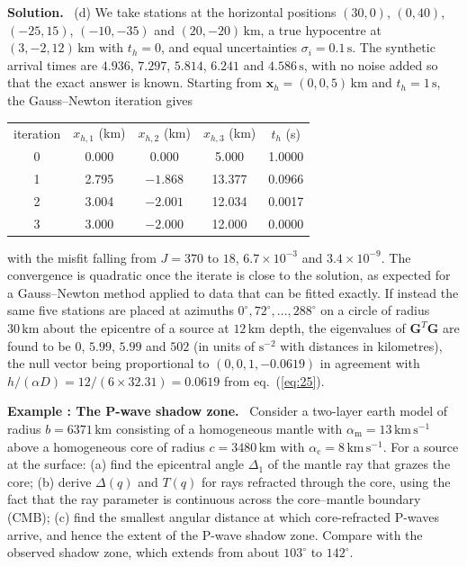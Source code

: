 \documentclass[a4paper,12pt]{paper}
\newcounter{example}
\renewenvironment{example}[1]{%
  \refstepcounter{example}%
  \begin{mdframed}[linewidth=1pt,innertopmargin=6pt,innerbottommargin=6pt]%
  \noindent\textbf{Example \theexample: #1.}\ }{%
  \end{mdframed}}
\newenvironment{solution}{\par\noindent\textbf{Solution.}\ }{\par\medskip}
\begin{document}
\begin{solution}
(d) We take stations at the horizontal positions $(30,0)$, $(0,40)$, $(-25,15)$, $(-10,-35)$
and $(20,-20)\,\mathrm{km}$, a true hypocentre at $(3,-2,12)\,\mathrm{km}$ with $t_{h}=0$,
and equal uncertainties $\sigma_{i}=0.1\,\mathrm{s}$. The synthetic arrival times are
$4.936$, $7.297$, $5.814$, $6.241$ and $4.586\,\mathrm{s}$, with no noise added so that the
exact answer is known. Starting from $\mathbf{x}_{h}=(0,0,5)\,\mathrm{km}$ and
$t_{h}=1\,\mathrm{s}$, the Gauss--Newton iteration gives
\begin{center}
\begin{tabular}{ccccc}
iteration & $x_{h,1}$ (km) & $x_{h,2}$ (km) & $x_{h,3}$ (km) & $t_{h}$ (s) \\[2pt]
0 & 0.000 & 0.000 & 5.000 & 1.0000 \\
1 & 2.795 & $-1.868$ & 13.377 & 0.0966 \\
2 & 3.004 & $-2.001$ & 12.034 & 0.0017 \\
3 & 3.000 & $-2.000$ & 12.000 & 0.0000
\end{tabular}
\end{center}
with the misfit falling from $J=370$ to $18$, $6.7\times10^{-3}$ and $3.4\times10^{-9}$. The
convergence is quadratic once the iterate is close to the solution, as expected for a
Gauss--Newton method applied to data that can be fitted exactly. If instead the same five
stations are placed at azimuths $0^{\circ},72^{\circ},\dots,288^{\circ}$ on a circle of radius
$30\,\mathrm{km}$ about the epicentre of a source at $12\,\mathrm{km}$ depth, the eigenvalues of
$\mathbf{G}^{T}\mathbf{G}$ are found to be $0$, $5.99$, $5.99$ and $502$ (in units of
$\mathrm{s^{-2}}$ with distances in kilometres), the null vector being proportional to
$(0,0,1,-0.0619)$ in agreement with $h/(\alpha D)=12/(6\times32.31)=0.0619$ from
eq.~(\ref{eq:25}).
\end{solution}

\begin{example}{The P-wave shadow zone}
Consider a two-layer earth model of radius $b=6371\,\mathrm{km}$ consisting of a homogeneous
mantle with $\alpha_{\mathrm{m}}=13\,\mathrm{km\,s^{-1}}$ above a homogeneous core of radius
$c=3480\,\mathrm{km}$ with $\alpha_{\mathrm{c}}=8\,\mathrm{km\,s^{-1}}$. For a source at the
surface: (a) find the epicentral angle $\Delta_{1}$ of the mantle ray that grazes the core;
(b) derive $\Delta(q)$ and $T(q)$ for rays refracted through the core, using the fact that the
ray parameter is continuous across the core--mantle boundary (CMB); (c) find the smallest angular
distance at which core-refracted P-waves arrive, and hence the extent of the P-wave shadow zone.
Compare with the observed shadow zone, which extends from about $103^{\circ}$ to $142^{\circ}$.
\end{example}
\end{document}
